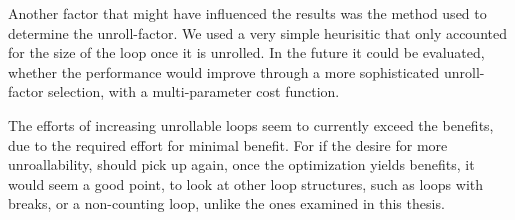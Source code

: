 Another factor that might have influenced the results was the method used to determine the unroll-factor.
We used a very simple heurisitic that only accounted for the size of the loop once it is unrolled.
In the future it could be evaluated, whether the performance would improve through a more sophisticated unroll-factor selection, with a multi-parameter cost function.

The efforts of increasing unrollable loops seem to currently exceed the benefits, due to the required effort for minimal benefit.
For if the desire for more unroallability, should pick up again, once the optimization yields benefits, it would seem a good point, to look at other loop structures, such as loops with breaks, or a non-counting loop, unlike the ones examined in this thesis.
